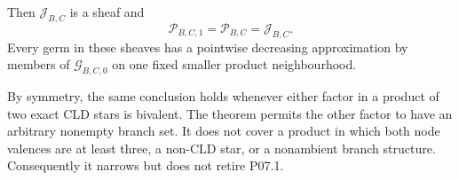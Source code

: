 \begin{theorem}
Then $\mathcal J_{B,C}$ is a sheaf and
\begin{equation}
             \mathcal P_{B,C,1}
             =\mathcal P_{B,C}
             =\mathcal J_{B,C}.
 \label{eq:p071-bivalent-product-collapse}
\end{equation}
Every germ in these sheaves has a pointwise decreasing approximation by
members of $\mathcal G_{B,C,0}$ on one fixed smaller product
neighbourhood.

By symmetry, the same conclusion holds whenever either factor in a
product of two exact CLD stars is bivalent.  The theorem permits the other
factor to have an arbitrary nonempty branch set.  It does not cover a
product in which both node valences are at least three, a non-CLD star, or
a nonambient branch structure.  Consequently it narrows but does not
retire P07.1.
\end{theorem}
